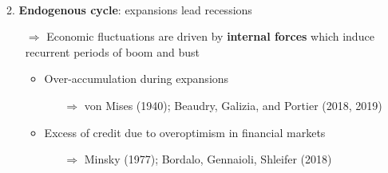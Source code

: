 \documentclass[hyperref={pdfpagelabels=false}]{beamer}
\begin{document}
{		
		
		\
		
2. \textbf{Endogenous cycle}: expansions lead recessions
\begin{itemize}
			\item[$\Rightarrow$] \small{Economic fluctuations are driven by \textbf{internal forces} which induce recurrent periods of boom and bust}
			

			
			
			\begin{itemize}
				\item Over-accumulation during expansions
				\begin{itemize}
				\item[$\Rightarrow$] von Mises (1940); Beaudry, Galizia, and Portier (2018, 2019) %
				\end{itemize}
			
			\bigskip
			
			
                \item Excess of credit due to overoptimism in financial markets  
                \begin{itemize}
				\item[$\Rightarrow$] Minsky (1977); Bordalo, Gennaioli, Shleifer (2018) %
				\end{itemize}  
			\end{itemize}
		
		\end{itemize}
		
		

}
\end{document}

